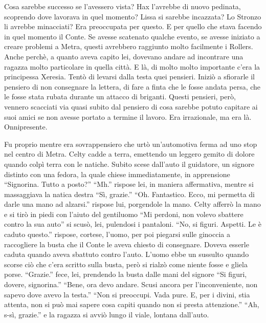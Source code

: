     Cosa sarebbe successo se l'avessero vista? Hax l'avrebbe di nuovo
    pedinata, scoprendo dove lavorava in quel momento? Lissa si sarebbe
    incazzata? Lo Stronzo li avrebbe minacciati? Era preoccupata per
    questo. E per quello che stava facendo in quel momento il Conte. Se
    avesse scatenato qualche evento, se avesse iniziato a creare problemi a
    Metra, questi avrebbero raggiunto molto facilmente i Rollers. Anche
    perchè, a quanto aveva capito lei, dovevano andare ad incontrare una
    ragazza molto particolare in quella città. E là, di molto molto
    importante c'era la principessa Xeresia. Tentò di levarsi dalla testa
    quei pensieri. Iniziò a sfiorarle il pensiero di non consegnare la
    lettera, di fare a finta che le fosse andata persa, che le fosse stata
    rubata durante un attacco di briganti. Questi pensieri, però, vennero
    scacciati via quasi subito dal pensiero di cosa sarebbe potuto capitare
    ai suoi amici se non avesse portato a termine il lavoro. Era
    irrazionale, ma era là. Onnipresente.

    Fu proprio mentre era sovrappensiero che urtò un'automotiva ferma ad uno
    stop nel centro di Metra. Celty cadde a terra, emettendo un leggero
    gemito di dolore quando colpì terra con le natiche. Subito scese
    dall'auto il guidatore, un signore distinto con una fedora, la quale
    chiese immediatamente, in apprensione ``Signorina. Tutto a posto?''
    ``Mh.'' rispose lei, in maniera affermativa, mentre si massaggiava la
    natica destra ``Sì, grazie.'' ``Oh. Fantastico. Ecco, mi permetta di darle una mano ad
    alzarsi.'' rispose lui, porgendole la mano. Celty afferrò la mano e si
    tirò in piedi con l'aiuto del gentiluomo ``Mi perdoni, non volevo
    sbattere contro la sua auto'' si scusò, lei, pulendosi i pantaloni.
    ``No, si figuri. Aspetti. Le è caduto questo.'' rispose, cortese,
    l'uomo, per poi piegarsi sulle ginoccia a raccogliere la busta che il
    Conte le aveva chiesto di consegnare. Doveva esserle caduta quando
    aveva sbattuto contro l'auto. L'uomo ebbe un sussulto quando scorse ciò
    che c'era scritto sulla busta, però si rialzò come niente fosse e
    gliela porse. ``Grazie.'' fece, lei, prendendo la busta dalle mani del
    signore ``Si figuri, dovere, signorina.'' ``Bene, ora devo andare.
    Scusi ancora per l'inconveniente, non sapevo dove avevo la testa.''
    ``Non si preoccupi. Vada pure. E, per i divini, stia attenta, non si
    può mai sapere cosa capiti quando non si presta attenzione.'' ``Ah,
    s-sì, grazie.'' e la ragazza si avviò lungo il viale, lontana
    dall'auto.

